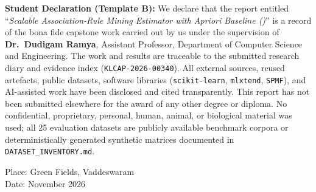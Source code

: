 \begin{klbox}[KLSlate]
\textbf{Student Declaration (Template B):} We declare that the report entitled ``\emph{Scalable Association-Rule Mining Estimator with Apriori Baseline (\skarm)}'' is a record of the bona fide capstone work carried out by us under the supervision of \textbf{Dr.~Dudigam Ramya}, Assistant Professor, Department of Computer Science and Engineering. The work and results are traceable to the submitted research diary and evidence index (\texttt{KLCAP-2026-00340}). All external sources, reused artefacts, public datasets, software libraries (\texttt{scikit-learn}, \texttt{mlxtend}, \texttt{SPMF}), and AI-assisted work have been disclosed and cited transparently. This report has not been submitted elsewhere for the award of any other degree or diploma. No confidential, proprietary, personal, human, animal, or biological material was used; all 25 evaluation datasets are publicly available benchmark corpora or deterministically generated synthetic matrices documented in \texttt{DATASET\_\protect\allowbreak{}INVENTORY.md}.
\end{klbox}

\vspace{6mm}
\begin{center}
\fontsize{10}{13}\selectfont
{}
\end{center}

\vspace{6mm}
Place: Green Fields, Vaddeswaram\\
Date: November 2026

\newpage

